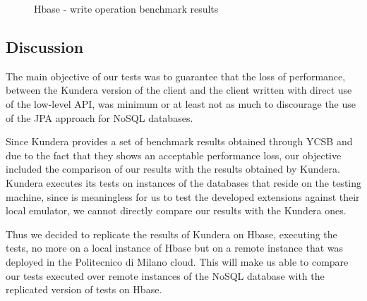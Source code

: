 \begin{figure}[tbh]
  \centering
  \caption{Hbase - write operation benchmark results}
  \label{fig:hbase-test-write}
\end{figure} 

\subsection{Discussion}
The main objective of our tests was to guarantee that the loss of performance, between the Kundera version of the client and the client written with direct use of the low-level API, was minimum or at least not as much to discourage the use of the JPA approach for NoSQL databases.

\noindent Since Kundera provides a set of benchmark results obtained through YCSB and due to the fact that they shows an acceptable performance loss, our objective included the comparison of our results with the results obtained by Kundera. Kundera executes its tests on instances of the databases that reside on the testing machine, since is meaningless for us to test the developed extensions against their local emulator, we cannot directly compare our results with the Kundera ones.

\noindent Thus we decided to replicate the results of Kundera on Hbase,  executing the tests, no more on a local instance of Hbase but on a remote instance that was deployed in the Politecnico di Milano cloud. This will make us able to compare our tests executed over remote instances of the NoSQL database with the replicated version of tests on Hbase.

